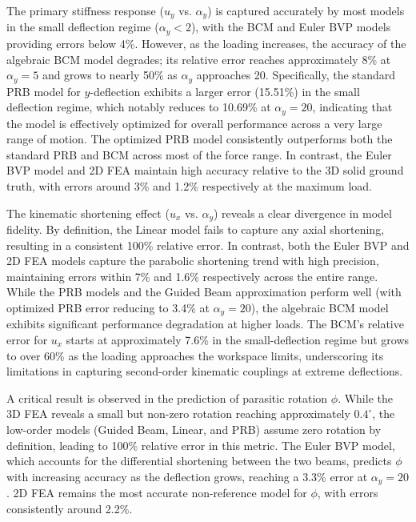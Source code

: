 \documentclass[colorlinks,upint,subscriptcorrection,varvw,hyphenate,balance]{asmeconf} %
\begin{document}
The primary stiffness response ($u_y$ vs. $\alpha_y$) is captured accurately by most models in the small deflection regime ($\alpha_y < 2$), with the BCM and Euler BVP models providing errors below 4\%. However, as the loading increases, the accuracy of the algebraic BCM model degrades; its relative error reaches approximately 8\% at $\alpha_y = 5$ and grows to nearly 50\% as $\alpha_y$ approaches 20. Specifically, the standard PRB model for $y$-deflection exhibits a larger error (15.51\%) in the small deflection regime, which notably reduces to 10.69\% at $\alpha_y = 20$, indicating that the model is effectively optimized for overall performance across a very large range of motion. The optimized PRB model consistently outperforms both the standard PRB and BCM across most of the force range. In contrast, the Euler BVP model and 2D FEA maintain high accuracy relative to the 3D solid ground truth, with errors around 3\% and 1.2\% respectively at the maximum load. 

The kinematic shortening effect ($u_x$ vs. $\alpha_y$) reveals a clear divergence in model fidelity. By definition, the Linear model fails to capture any axial shortening, resulting in a consistent 100\% relative error. In contrast, both the Euler BVP and 2D FEA models capture the parabolic shortening trend with high precision, maintaining errors within 7\% and 1.6\% respectively across the entire range. While the PRB models and the Guided Beam approximation perform well (with optimized PRB error reducing to 3.4\% at $\alpha_y = 20$), the algebraic BCM model exhibits significant performance degradation at higher loads. The BCM's relative error for $u_x$ starts at approximately 7.6\% in the small-deflection regime but grows to over 60\% as the loading approaches the workspace limits, underscoring its limitations in capturing second-order kinematic couplings at extreme deflections.

A critical result is observed in the prediction of parasitic rotation $\phi$. While the 3D FEA reveals a small but non-zero rotation reaching approximately $0.4^\circ$, the low-order models (Guided Beam, Linear, and PRB) assume zero rotation by definition, leading to 100\% relative error in this metric. The Euler BVP model, which accounts for the differential shortening between the two beams, predicts $\phi$ with increasing accuracy as the deflection grows, reaching a 3.3\% error at $\alpha_y = 20$. 2D FEA remains the most accurate non-reference model for $\phi$, with errors consistently around 2.2\%.
\end{document}
